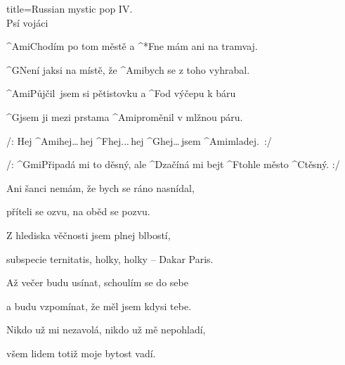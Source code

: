 \begin{song}{title=\predtitle\centering Russian mystic pop IV. \\\large Psí vojáci  \vspace*{-0.3cm}}  %
\begin{centerjustified}
\nejnejvetsi

\sloka 
	^{Ami\z}Chodím po tom městě a ^*{F\:}ne mám ani na tramvaj.

	^{G\z}Není jaksi na místě, že ^{Ami}bych se z toho vyhrabal.

	^{Ami\z}Půjčil~jsem si pětistovku a ^{F}od výčepu k báru

	^{G}jsem ji mezi prstama ^{{\z}Ami\:}proměnil v mlžnou páru.

	/: Hej ^{Ami\phantom{dddd}}hej\elipsa\dots\,hej ^{F\phantom{dddd}}hej\elipsa.\elipsa.\elipsa.\,hej ^{G\phantom{dddddd}}hej\elipsa\dots\,jsem ^{{\z}Ami\:\:}mladej.~:/

	 /: ^{Gmi{\z}}Připadá mi to děsný, ale ^{D{\z}}začíná mi bejt ^{F{\z}}tohle město ^{C{\z}}těsný. :/

\sloka
	Ani šanci nemám, že bych se ráno nasnídal,

	příteli se ozvu, na oběd se pozvu.

	Z hlediska věčnosti jsem plnej blbostí,

	subspecie ternitatis, holky, holky -- Dakar Paris.


\sloka
	Až večer budu usínat, schoulím se do sebe

	a budu vzpomínat, že měl jsem kdysi tebe.

	Nikdo už mi nezavolá, nikdo už mě nepohladí,

	všem lidem totiž moje bytost vadí.


\end{centerjustified}

\centering
{}

\setcounter{Slokočet}{0}
\end{song}
